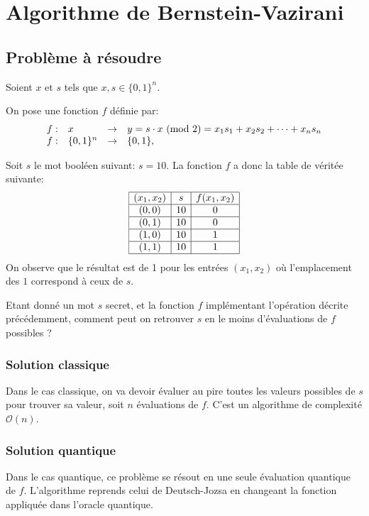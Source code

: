 \chapter{Algorithme de Bernstein-Vazirani}
\section{Problème à résoudre}

Soient $x$ et $s$ tels que $x, s \in \{0, 1\}^n$.

On pose une fonction $f$ définie par:
\[
  \begin{array}{llll}
    f :  &  x              & \to     & y = s \cdot x \ (\mathrm{mod}\ 2) = x_1 s_1 + x_2 s_2 + \dots + x_n s_n \\
    f:   &  \{0, 1\}^n     & \to     & \{0, 1\},
  \end{array}  
\]

\begin{ex}
  Soit $s$ le mot booléen suivant: $s = 10$. La fonction $f$ a donc la table de véritée suivante:
\[
  \begin{array}{|c|c|c|}
    \hline
   (x_1, x_2) & s & f(x_1,x_2) \\
    \hline
    (0,0) & 10 & 0 \\
    \hline
    (0,1) & 10 & 0 \\
    \hline
    (1,0) & 10 & 1 \\
    \hline
    (1,1) & 10 & 1 \\
    \hline
  \end{array}
\]
On observe que le résultat est de 1 pour les entrées $(x_1, x_2)$ où l'emplacement des $1$ correspond à ceux de $s$.
\end{ex}

\begin{pb}
Etant donné un mot $s$ secret, et la fonction $f$ implémentant l'opération décrite précédemment, comment peut on retrouver $s$ en le moins d'évaluations de $f$ possibles ?
\end{pb}

\subsection{Solution classique}
Dans le cas classique, on va devoir évaluer au pire toutes les valeurs possibles de $s$ pour trouver sa valeur, soit $n$ évaluations de $f$. C'est un algorithme de complexité $\mathcal{O}(n)$.

\subsection{Solution quantique}
Dans le cas quantique, ce problème se résout en une seule évaluation
quantique de $f$. L'algorithme reprends celui de Deutsch-Jozsa en changeant la fonction appliquée dans l'oracle quantique.

